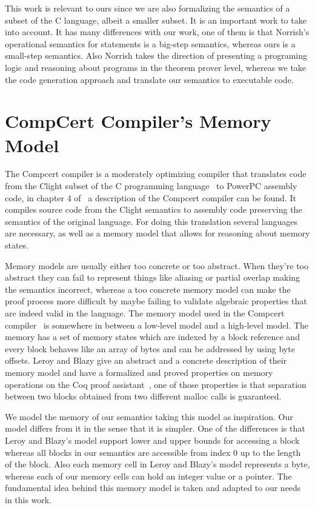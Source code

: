 This work is relevant to ours since we are also formalizing the semantics of a subset of the C language, albeit a smaller subset.
It is an important work to take into account.
It has many differences with our work, one of them is that Norrish's operational semantics for statements is a big-step semantics, whereas ours is a small-step semantics.
Also Norrish takes the direction of presenting a programing logic and reasoning about programs in the theorem prover level, whereas we take the code generation approach and translate our semantics to executable code.


\section{CompCert Compiler's Memory Model}

The Compcert compiler is a moderately optimizing compiler that translates code from the Clight subset of the C programming language~\parencite{clight} to PowerPC assembly code, in chapter 4 of~\parencite{compcert-float-point} a description of the Compcert compiler can be found.
It compiles source code from the Clight semantics to assembly code preserving the semantics of the original language.
For doing this translation several languages are necessary, as well as a memory model that allows for reasoning about memory states.

Memory models are usually either too concrete or too abstract.
When they're too abstract they can fail to represent things like aliasing or partial overlap making the semantics incorrect, whereas a too concrete memory model can make the proof process more difficult by maybe failing to validate algebraic properties that are indeed valid in the language.
The memory model used in the Compcert compiler~\parencite{leroy-blazy-memory-model} is somewhere in between a low-level model and a high-level model.
The memory has a set of memory states which are indexed by a block reference and every block behaves like an array of bytes and can be addressed by using byte offsets.
Leroy and Blazy give an abstract and a concrete description of their memory model and have a formalized and proved properties on memory operations on the Coq proof assistant~\parencite{coq-doc}, one of those properties is that separation between two blocks obtained from two different malloc calls is guaranteed.

We model the memory of our semantics taking this model as inspiration.
Our model differs from it in the sense that it is simpler.
One of the differences is that Leroy and Blazy's model support lower and upper bounds for accessing a block whereas all blocks in our semantics are accessible from index $0$ up to the length of the block.
Also each memory cell in Leroy and Blazy's model represents a byte, whereas each of our memory cells can hold an integer value or a pointer.
The fundamental idea behind this memory model is taken and adapted to our needs in this work.


